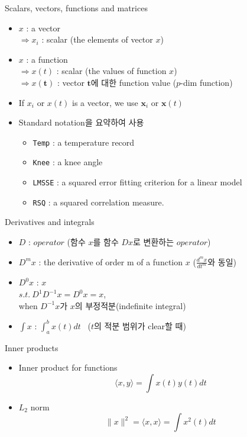 \documentclass{beamer}
\begin{document}
\begin{frame}{Scalars, vectors, functions and matrices}
  \begin{itemize}
	\item {
		$x$ : a vector \\
		$\Rightarrow x_i$ : scalar (the elements of vector $x$)
	}
	\item {
		$x$ : a function \\
		$\Rightarrow x(t)$ : scalar (the values of function $x$) \\
		$\Rightarrow x(\mathbf{t})$ : vector $\mathbf{t}$에 대한 function value ($p$-dim function)
	}
	\item {
		If $x_i$ or $x(t)$ is a vector, we use $\boldsymbol{x}_i$ or $\boldsymbol{x}(t)$
	}
	\item {
		Standard notation을 요약하여 사용
	    \begin{itemize}
			\item
				\texttt{Temp} : a temperature record
			\item
				\texttt{Knee} : a knee angle
			\item
				\texttt{LMSSE} : a squared error fitting criterion for a linear model
			\item
				\texttt{RSQ} : a squared correlation measure.
		\end{itemize}	
	}
  \end{itemize}
\end{frame}

\begin{frame}{Derivatives and integrals}
	\begin{itemize}
		\item {
			$D$ : $operator$ (함수 $x$를 함수 $Dx$로 변환하는 $operator$)
		}
		\item {
			$D^m x$ : the derivative of order m of a function $x$ ($\frac{d^mx}{dt^m}$와 동일)
		}
		\item {
			$D^0 x$ : $x$ \\
			$s.t. \ D^{1}D^{-1}x=D^0x=x$,\\
			when $D^{-1}x$가 $x$의 부정적분(indefinite integral)
		}
		\item {
			$\int x$ : $\int_{a}^{b} x(t)dt$ \ ($t$의 적분 범위가 clear할 때)
		}
	\end{itemize}
\end{frame}

\begin{frame}{Inner products}
	\begin{itemize}
		\item {
			Inner product for functions\\
			$$\langle x,y \rangle = \int x(t)y(t)dt $$
		}
		\item {
			$L_2$ norm \\
			$$ \lVert x \rVert^2=\langle x,x \rangle = \int x^2(t)dt $$
		}
	\end{itemize}
\end{frame}
\end{document}
